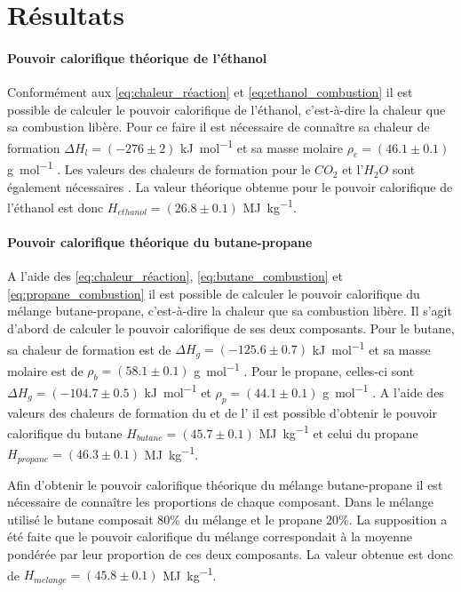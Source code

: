 \section{Résultats}

\paragraph*{Pouvoir calorifique théorique de l'éthanol}
Conformément aux \autoref{eq:chaleur_réaction} et \autoref{eq:ethanol_combustion} il est possible de calculer le pouvoir calorifique de l'éthanol, c'est-à-dire la chaleur que sa combustion libère. Pour ce faire il est nécessaire de connaître sa chaleur de formation \(\Delta H_{l} = (-276 \pm 2)\) \si{\kilo\joule\per\mol} et sa masse molaire \(\rho_e = (46.1 \pm 0.1)\) \si{\gram\per\mol} \cite{ethanol-values}. Les valeurs des chaleurs de formation pour le \(CO_2\) et l'\(H_2O\) sont également nécessaires \cite{notice}. La valeur théorique obtenue pour le pouvoir calorifique de l'éthanol est donc \(H_{ethanol} = (26.8 \pm 0.1)\) \si{\mega\joule\per\kilo\gram}.







\paragraph*{Pouvoir calorifique théorique du butane-propane}
A l'aide des \autoref{eq:chaleur_réaction}, \autoref{eq:butane_combustion} et \autoref{eq:propane_combustion} il est possible de calculer le pouvoir calorifique du mélange butane-propane, c'est-à-dire la chaleur que sa combustion libère. Il s'agit d'abord de calculer le pouvoir calorifique de ses deux composants. Pour le butane, sa chaleur de formation est de \(\Delta H_{g} = (-125.6 \pm 0.7)\) \si{\kilo\joule\per\mol} et sa masse molaire est de \(\rho_b = (58.1 \pm 0.1)\) \si{\gram\per\mol} \cite{butane-values}. Pour le propane, celles-ci sont \(\Delta H_{g} = (-104.7 \pm 0.5)\) \si{\kilo\joule\per\mol} et \(\rho_p = (44.1 \pm 0.1)\) \si{\gram\per\mol} \cite{propane-values}. A l'aide des valeurs des chaleurs de formation du  et de l' \cite{notice} il est possible d'obtenir le pouvoir calorifique du butane \(H_{butane} = (45.7 \pm 0.1)\) \si{\mega\joule\per\kilo\gram} et celui du propane \(H_{propane} = (46.3 \pm 0.1)\) \si{\mega\joule\per\kilo\gram}.

Afin d'obtenir le pouvoir calorifique théorique du mélange butane-propane il est nécessaire de connaître les proportions de chaque composant. Dans le mélange utilisé le butane composait 80\% du mélange et le propane 20\%. La supposition a été faite que le pouvoir calorifique du mélange correspondait à la moyenne pondérée par leur proportion de ces deux composants. La valeur obtenue est donc de \(H_{melange} = (45.8 \pm 0.1)\) \si{\mega\joule\per\kilo\gram}.





